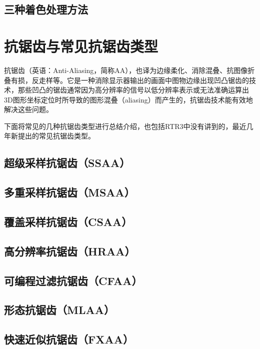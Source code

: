 \documentclass[UTF8,a4paper,12pt]{ctexbook}
\begin{document}
		\subsection{三种着色处理方法}
		
		
	\section{抗锯齿与常见抗锯齿类型}
		抗锯齿（英语：Anti-Aliasing，简称AA），也译为边缘柔化、消除混叠、抗图像折叠有损，反走样等。它是一种消除显示器输出的画面中图物边缘出现凹凸锯齿的技术，那些凹凸的锯齿通常因为高分辨率的信号以低分辨率表示或无法准确运算出3D图形坐标定位时所导致的图形混叠（aliasing）而产生的，抗锯齿技术能有效地解决这些问题。
		
		下面将常见的几种抗锯齿类型进行总结介绍，也包括RTR3中没有讲到的，最近几年新提出的常见抗锯齿类型。
		
		\subsection{超级采样抗锯齿（SSAA）}
		
		\subsection{多重采样抗锯齿（MSAA）}
		
		\subsection{覆盖采样抗锯齿（CSAA）}
		
		\subsection{高分辨率抗锯齿（HRAA）}
		
		\subsection{可编程过滤抗锯齿（CFAA）}
		
		\subsection{形态抗锯齿（MLAA）}
		
		\subsection{快速近似抗锯齿（FXAA）}
		
\end{document}
